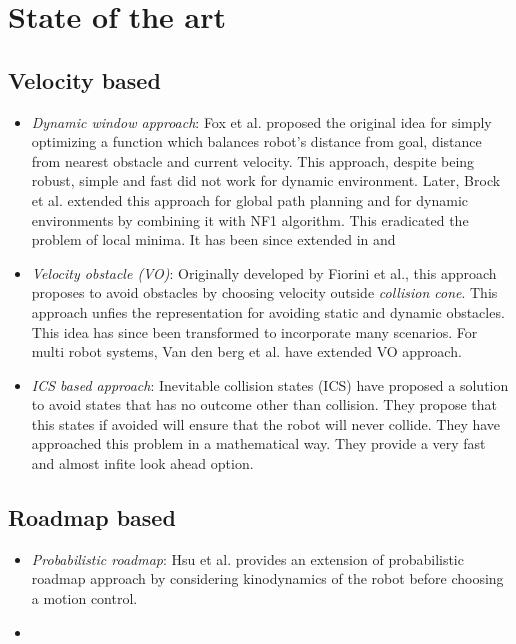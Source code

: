 \documentclass[rnd]{mas_proposal}
\begin{document}
\section{State of the art}
\subsection{Velocity based}
\begin{itemize}
    \item \textit{Dynamic window approach}: Fox et al. \cite{fox1997dynamic} proposed the original idea for simply optimizing a function which balances robot's distance from goal, distance from nearest obstacle and current velocity. This approach, despite being robust, simple and fast did not work for dynamic environment. 
        Later, Brock et al. \cite{brock1999high} extended this approach for global path planning and for dynamic environments by combining it with NF1 algorithm. 
        This eradicated the problem of local minima. 
        It has been since extended in \cite{seder2007dynamic} and \cite{ogren2005convergent}
    \item \textit{Velocity obstacle (VO)}: Originally developed by Fiorini et al.\cite{fiorini1998motion}, this approach proposes to avoid obstacles by choosing velocity outside \textit{collision cone}.
        This approach unfies the representation for avoiding static and dynamic obstacles.
        This idea has since been transformed to incorporate many scenarios\cite{shiller2010nonlinear}\cite{owen2006a}\cite{owen2005motion}\cite{guy2009clearpath}. 
        For multi robot systems, Van den berg et al.\cite{van2008reciprocal}\cite{van2011reciprocal}\cite{van2006anytime} have extended VO approach.
    \item \textit{ICS based approach}: Inevitable collision states (ICS) \cite{fraichard2004inevitable}\cite{petti2005safe}\cite{martinez2009collision} have proposed a solution to avoid states that has no outcome other than collision. They propose that this states if avoided will ensure that the robot will never collide. They have approached this problem in a mathematical way. They provide a very fast and almost infite look ahead option\cite{mohanan2018a}.

\end{itemize}

\subsection{Roadmap based}
\begin{itemize}
    \item \textit{Probabilistic roadmap}: Hsu et al.\cite{hsu2002randomized} provides an extension of probabilistic roadmap approach by considering kinodynamics of the robot before choosing a motion control.
    \item \cite{van2005roadmap}
\end{itemize}
\end{document}
